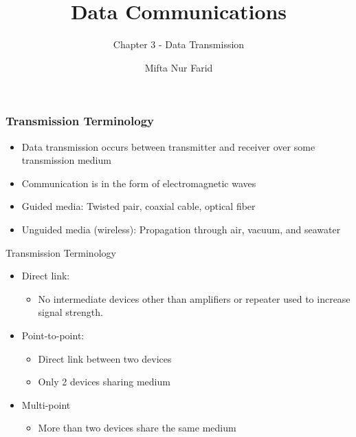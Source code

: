 \documentclass[pdflatex,compress]{beamer}
\title{Data Communications}
\subtitle{Chapter 3 - Data Transmission}
\author{Mifta Nur Farid}
\begin{document}
\maketitle

\begin{frame}
	\frametitle{Transmission Terminology}
	\begin{itemize}
		\item Data transmission occurs between transmitter and receiver over some transmission medium
		\item Communication is in the form of electromagnetic waves
		\item Guided media: Twisted pair, coaxial cable, optical fiber
		\item Unguided media (wireless): Propagation through air, vacuum, and seawater
	\end{itemize}
\end{frame}

\begin{frame}{Transmission Terminology}
	\begin{itemize}
		\item Direct link:
		\begin{itemize}
			\item No intermediate devices other than amplifiers or repeater used to increase signal strength.
		\end{itemize}
		\item Point-to-point: 
		\begin{itemize}
			\item Direct link between two devices
			\item Only 2 devices sharing medium
		\end{itemize}
		\item Multi-point
		\begin{itemize}
			\item More than two devices share the same medium
		\end{itemize}
	\end{itemize}
\end{frame}
\end{document}
